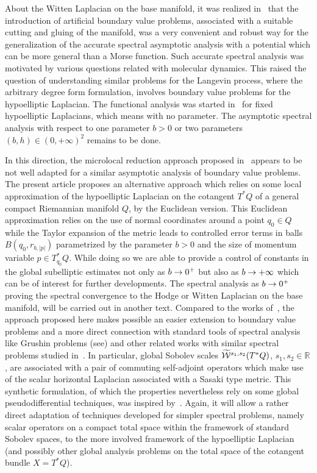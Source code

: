 \documentclass[10pt]{amsart}
\theoremstyle{definition}\newtheorem{defi}[theo]{Definition}\newtheorem{rema}[theo]{Remark}\newtheorem{exam}[theo]{Example}\newtheorem{exem}[theo]{Example}\newtheorem{nota}[theo]{Notation}
\newcommand{\R}{\mathbb{R}}
\newcommand{\clW}{\mathcal{W}}
\let\oldtilde\tilde
\renewcommand*{\tilde}[1]{\mathchoice{\widetilde{#1}}{\widetilde{#1}}{\oldtilde{#1}}{\oldtilde{#1}}}
\renewcommand*{\to}{\mathchoice{\longrightarrow}{\rightarrow}{\rightarrow}{\rightarrow}}
\begin{document}
About the Witten Laplacian on the base manifold, it was realized in~\cite{LNV2,LNV1} that the introduction of artificial boundary value problems, associated with a suitable cutting and gluing of the manifold, was a very convenient and robust way for the generalization of the accurate spectral asymptotic analysis with a potential which can be more general than a Morse function. Such accurate spectral analysis was motivated by various questions related with molecular dynamics. This raised the question of understanding similar problems for the Langevin process, where the arbitrary degree form formulation, involves boundary value problems for the hypoelliptic Laplacian. The functional analysis was started in~\cite{Nie,NiSh} for fixed hypoelliptic Laplacians, which means with no parameter. The asymptotic spectral analysis with respect to one parameter $b>0$ or two parameters $(b,h)\in (0,+\infty)^{2}$ remains to be done.

In this direction, the microlocal reduction approach proposed in~\cite{BiLe,Leb1,Leb2} appears to be not well adapted for a similar asymptotic analysis of boundary value problems. The present article proposes an alternative approach which relies on some local approximation of the hypoelliptic Laplacian on the cotangent $T^{*}Q$ of a general compact Riemannian manifold $Q$, by the Euclidean version. This Euclidean approximation relies on the use of normal coordinates around a point $q_{0}\in Q$ while the Taylor expansion of the metric leads to controlled error terms in balls $B(q_{0},r_{b,|p|})$ parametrized by the parameter $b>0$ and the size of momentum variable $p\in T^{*}_{q_{0}}Q$.
While doing so we are able to provide a control of constants in the global subelliptic estimates not only as $b\to 0^{+}$ but also as $b\to +\infty$ which can be of interest for further developments. The spectral analysis as $b\to 0^{+}$ proving the spectral convergence to the Hodge or Witten Laplacian on the base manifold, will be carried out in another text. Compared to the works of~\cite{BiLe,She}, the approach proposed here makes possible an easier extension to boundary value problems and a more direct connection with standard tools of spectral analysis like Grushin problems (see\cite{SjZw}) and other related works with similar spectral problems studied in~\cite{Dro,ReTa,Smi}. In particular, global Sobolev scales $\tilde{\clW}^{s_{1},s_{2}}(T^{*}Q)$, $s_{1},s_{2}\in
\R$, are associated with a pair of commuting self-adjoint operators which make use of the scalar horizontal Laplacian associated with a Sasaki type metric. This synthetic formulation, of which the properties nevertheless rely on some global pseudodifferential techniques, was inspired by~\cite{BeBo,ReTa}. Again, it will allow a rather direct adaptation of techniques developed for simpler spectral problems, namely scalar operators on a compact total space within the framework of standard Sobolev spaces, to the more involved framework of the hypoelliptic Laplacian (and possibly other global analysis problems on the total space of the cotangent bundle $X=T^{*}Q$).
\end{document}
